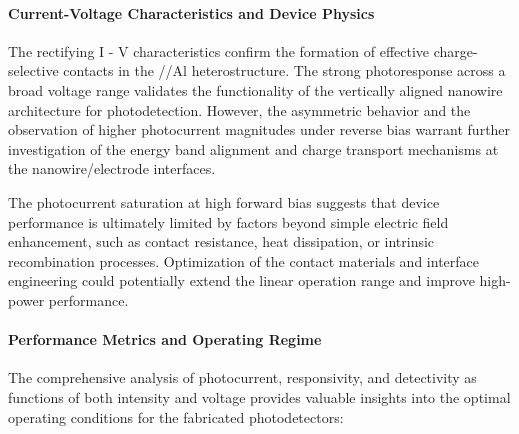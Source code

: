 \documentclass{rapportCS}
\begin{document}
	\paragraph{Current-Voltage Characteristics and Device Physics}
	
	The rectifying I - V characteristics confirm the formation of effective charge-selective contacts in the //Al heterostructure. The strong photoresponse across a broad voltage range validates the functionality of the vertically aligned nanowire architecture for photodetection. However, the asymmetric behavior and the observation of higher photocurrent magnitudes under reverse bias warrant further investigation of the energy band alignment and charge transport mechanisms at the nanowire/electrode interfaces.
	
	The photocurrent saturation at high forward bias suggests that device performance is ultimately limited by factors beyond simple electric field enhancement, such as contact resistance, heat dissipation, or intrinsic recombination processes. Optimization of the contact materials and interface engineering could potentially extend the linear operation range and improve high-power performance.
	
	\paragraph{Performance Metrics and Operating Regime}
	
	The comprehensive analysis of photocurrent, responsivity, and detectivity as functions of both intensity and voltage provides valuable insights into the optimal operating conditions for the fabricated photodetectors:
	
\end{document}
